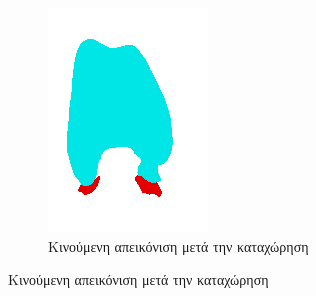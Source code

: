 \documentclass[a4paper,12pt]{article}
\begin{document}
\begin{figure}[H]
\begin{subfigure}[t]{0.4\linewidth}
    \includegraphics[width=\linewidth]{moving_label_before_registration_3.png}
    \caption{Κινούμενη απεικόνιση μετά την καταχώρηση}
    \end{subfigure}


\end{figure}
\end{document}
